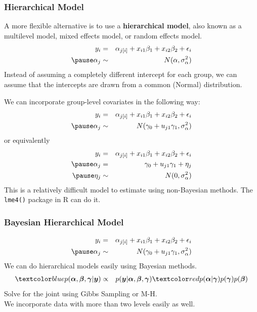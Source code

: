 \documentclass[handout]{beamer}
\begin{document}
\begin{frame}
\frametitle{Hierarchical Model}
\pause
A more flexible alternative is to use a {\bf hierarchical model}, also
known as a multilevel model, mixed effects model, or random effects model.
\pause
\begin{eqnarray*}
y_i &=& \alpha_{j[i]} +  x_{i1} \beta_1 + x_{i2} \beta_2 + \epsilon_i\\
\pause
\alpha_{j} &\sim& N(\alpha, \sigma^2_{\alpha}) \\
\end{eqnarray*}
\pause
Instead of assuming a completely different intercept for each group,
we can assume that the intercepts are drawn from a common (Normal) distribution.
\end{frame}

\begin{frame}
We can incorporate group-level covariates in the following way:
\pause
\begin{eqnarray*}
y_i &=& \alpha_{j[i]} +  x_{i1} \beta_1 + x_{i2} \beta_2 + \epsilon_i\\
\pause
\alpha_{j} &\sim& N(\gamma_0 + u_{j1} \gamma_1, \sigma^2_{\alpha}) \\
\end{eqnarray*}
\pause
or equivalently
\pause 
\begin{eqnarray*}
y_i &=& \alpha_{j[i]} +  x_{i1} \beta_1 + x_{i2} \beta_2 + \epsilon_i\\
\pause
\alpha_{j} &=& \gamma_0 + u_{j1} \gamma_1 + \eta_j \\
\pause
\eta_j &\sim& N(0, \sigma^2_{\alpha}) \\
\end{eqnarray*}
\pause
This is a relatively difficult model to estimate using non-Bayesian
methods.  The {\tt lme4()} package in R can do it.
\end{frame}

\begin{frame}
\frametitle{Bayesian Hierarchical Model}
\pause
\begin{eqnarray*}
y_i &=& \alpha_{j[i]} +  x_{i1} \beta_1 + x_{i2} \beta_2 + \epsilon_i\\
\pause
\alpha_{j} &\sim& N(\gamma_0 + u_{j1} \gamma_1, \sigma^2_{\alpha}) \\
\end{eqnarray*}
\pause
We can do hierarchical models easily using Bayesian methods.
\pause
\begin{eqnarray*}
\blue{p(\bm{\alpha}, \bm{\beta}, \bm{\gamma}|\bm{y})} &\propto& p(\bm{y}
| \bm{\alpha}, \bm{\beta}, \bm{\gamma})
\red{p(\bm{\alpha}|\bm{\gamma}) p(\bm{\gamma}) p(\bm{\beta})} \\
\end{eqnarray*}
\pause
Solve for the joint  using Gibbs Sampling or M-H. \\
\pause
\bigskip
We incorporate data with more than two levels easily as well.
\end{frame}
\end{document}
